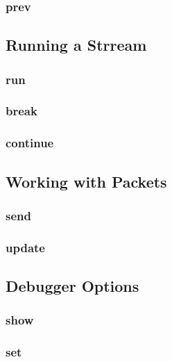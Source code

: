 \documentclass[11pt]{article}
\begin{document}
\subsubsection{prev}

\subsection{Running a Strream}

\subsubsection{run}

\subsubsection{break}

\subsubsection{continue}

\subsection{Working with Packets}

\subsubsection{send}

\subsubsection{update}

\subsection{Debugger Options}

\subsubsection{show}

\subsubsection{set}
\end{document}
